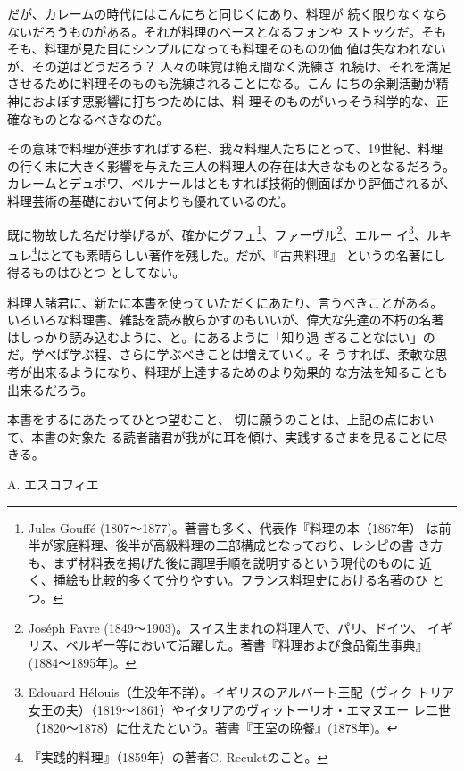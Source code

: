 だが、カレームの時代にはこんにちと同じくにあり、料理が
続く限りなくならないだろうものがある。それが料理のベースとなるフォンや
ストックだ。そもそも、料理が見た目にシンプルになっても料理そのものの価
値は失なわれないが、その逆はどうだろう？ 人々の味覚は絶え間なく洗練さ
れ続け、それを満足させるために料理そのものも洗練されることになる。こん
にちの余剰活動が精神におよぼす悪影響に打ちつためには、料
理そのものがいっそう科学的な、正確なものとなるべきなのだ。

その意味で料理が進歩すればする程、我々料理人たちにとって、19世紀、料理
の行く末に大きく影響を与えた三人の料理人の存在は大きなものとなるだろう。
カレームとデュボワ、ベルナールはともすれば技術的側面ばかり評価されるが、
料理芸術の基礎において何よりも優れているのだ。

既に物故した名だけ挙げるが、確かにグフェ\footnote{Jules Gouffé
  (1807〜1877)。著書も多く、代表作『料理の本（1867年）
  は前半が家庭料理、後半が高級料理の二部構成となっており、レシピの書
  き方も、まず材料表を掲げた後に調理手順を説明するという現代のものに
  近く、挿絵も比較的多くて分りやすい。フランス料理史における名著のひ
  とつ。}、ファーヴル\footnote{Joséph Favre
  (1849〜1903)。スイス生まれの料理人で、パリ、ドイツ、
  イギリス、ベルギー等において活躍した。著書『料理および食品衛生事典』
  (1884〜1895年)。}、エルー イ\footnote{Edouard
  Hélouis（生没年不詳）。イギリスのアルバート王配（ヴィク
  トリア女王の夫）（1819〜1861）やイタリアのヴィットーリオ・エマヌエー
  レ二世（1820〜1878）に仕えたという。著書『王室の晩餐』(1878年)。}、ルキュレ\footnote{『実践的料理』（1859年）の著者C.
  Reculetのこと。}はとても素晴らしい著作を残した。だが、『古典料理』
というの名著にし得るものはひとつ
としてない。

料理人諸君に、新たに本書を使っていただくにあたり、言うべきことがある。
いろいろな料理書、雑誌を読み散らかすのもいいが、偉大な先達の不朽の名著
はしっかり読み込むように、と。にあるように「知り過
ぎることなはい」のだ。学べば学ぶ程、さらに学ぶべきことは増えていく。そ
うすれば、柔軟な思考が出来るようになり、料理が上達するためのより効果的
な方法を知ることも出来るだろう。

本書をするにあたってひとつ望むこと、
切に願うのことは、上記の点において、本書の対象た
る読者諸君が我がに耳を傾け、実践するさまを見ることに尽
きる。\nopagebreak

\begin{flushright}
A. エスコフィエ \nopagebreak
\end{flushright}

